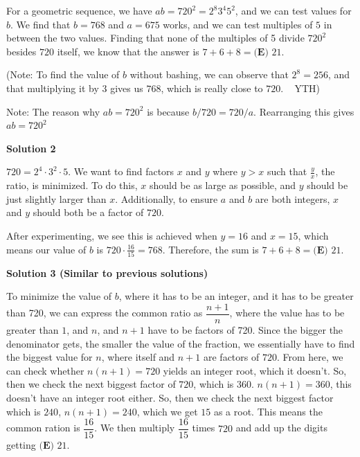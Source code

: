 \begin{enumerate}
For a geometric sequence, we have $ab=720^2=2^8 3^4 5^2$, and we can test values for $b$. We find that $b=768$ and $a=675$ works, and we can test multiples of $5$ in between the two values. Finding that none of the multiples of 5 divide $720^2$ besides $720$ itself, we know that the answer is $7+6+8=\boxed{\textbf{(E) } 21}$.

 (Note: To find the value of $b$ without bashing, we can observe that $2^8=256$, and that multiplying it by $3$ gives us $768$, which is really close to $720$. ~ YTH)

 Note: The reason why $ab=720^2$ is because $b/720 = 720/a$. Rearranging this gives $ab = 720^2$




\textbf{Solution 2}

$720 = 2^4 \cdot 3^2 \cdot 5$. We want to find factors $x$ and $y$ where $y>x$ such that $\frac{y}{x}$, the ratio, is minimized. To do this, $x$ should be as large as possible, and $y$ should be just slightly larger than $x$. Additionally, to ensure $a$ and $b$ are both integers, $x$ and $y$ should both be a factor of $720$.

 After experimenting, we see this is achieved when $y=16$ and $x=15$, which means our value of $b$ is $720 \cdot \frac{16}{15} = 768$. Therefore, the sum is $7+6+8=\boxed{\textbf{(E) } 21}$.

 



\textbf{Solution 3 (Similar to previous solutions)}

To minimize the value of $b$, where it has to be an integer, and it has to be greater than 720, we can express the common ratio as $\dfrac{n+1}{n}$, where the value has to be greater than $1$, and $n$, and $n+1$ have to be factors of 720. Since the bigger the denominator gets, the smaller the value of the fraction, we essentially have to find the biggest value for $n$, where itself and $n+1$ are factors of $720$. From here, we can check whether $n(n+1) = 720$ yields an integer root, which it doesn't. So, then we check the next biggest factor of $720$, which is $360$. $n(n+1) = 360$, this doesn't have an integer root either. So, then we check the next biggest factor which is $240$, $n(n+1) = 240$, which we get $15$ as a root. This means the common ration is $\dfrac{16}{15}$. We then multiply $\dfrac{16}{15}$ times $720$ and add up the digits getting $\boxed{\textbf{(E) } 21}$.

 




\end{enumerate}
